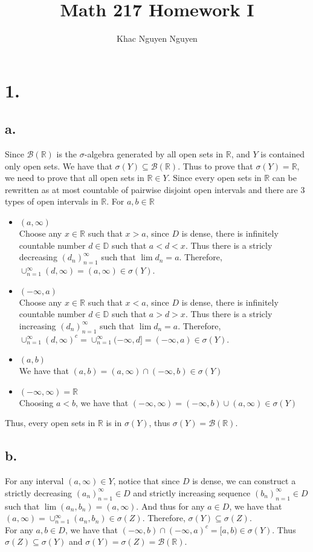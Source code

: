 \documentclass[11pt]{article}
\title{\textbf{Math 217 Homework I}}
\author{Khac Nguyen Nguyen}
\date{}
\theoremstyle{mystyle}
\theoremstyle{definition}
\begin{document}
\section*{1.}
\subsection*{a.}
Since $\mathcal{B}(\mathbb{R})$ is the $\sigma$-algebra generated by all open sets in $\mathbb{R}$, and $Y$ is contained only open sets. We have that $\sigma(Y) \subseteq \mathcal{B}(\mathbb{R})$. Thus to prove that $\sigma(Y) = \mathbb{R}$, we need to prove that all open sets in $\mathbb{R} \in Y$. Since every open sets in $\mathbb{R}$ can be rewritten as at most countable of pairwise disjoint open intervals and there are 3 types of open intervals in $\mathbb{R}$. For $a, b \in \mathbb{R}$ 
\begin{itemize}
  \item $(a,\infty)$ \\
    Choose any $x \in \mathbb{R}$ such that $x>a$, since $D$ is dense, there is infinitely countable number $d \in \mathbb{D}$ such that $a<d<x$. Thus there is a stricly decreasing $(d_n)_{n=1}^\infty$ such that $\lim d_n = a$. Therefore, $\cup_{n=1}^\infty (d, \infty) = (a, \infty) \in \sigma(Y)$.    
  \item $(-\infty, a)$ \\
    Choose any $x \in \mathbb{R}$ such that $x<a$, since $D$ is dense, there is infinitely countable number $d \in \mathbb{D}$ such that $a>d>x$. Thus there is a stricly increasing $(d_n)_{n=1}^\infty$ such that $\lim d_n = a$. Therefore, $\cup_{n=1}^\infty (d, \infty)^c = \cup_{n=1}^\infty (-\infty, d] = (-\infty, a) \in \sigma(Y)$.    
  \item $(a, b)$ \\
    We have that $(a,b) = (a, \infty) \cap (-\infty, b) \in \sigma(Y)$
  \item $(-\infty, \infty) = \mathbb{R}$ \\
    Choosing $a<b$, we have that 
    $(-\infty, \infty) = (-\infty, b) \cup (a, \infty) \in \sigma(Y)$
\end{itemize}
Thus, every open sets in $\mathbb{R}$ is in $\sigma(Y)$, thus $\sigma(Y) = \mathcal{B}(\mathbb{R})$. 
\subsection*{b.}
For any interval $(a, \infty) \in Y$,  notice that since $D$ is dense, we can construct a strictly decreasing $(a_n)_{n=1}^\infty \in D$ and strictly increasing sequence $(b_n)_{n=1}^\infty \in D$ such that $\lim (a_n, b_n) = (a, \infty)$. And thus for any $a \in D$, we have that $(a, \infty) = \cup_{n=1}^\infty (a_n, b_n) \in \sigma(Z)$. Therefore, $\sigma(Y) \subseteq \sigma(Z)$. \\
For any $a, b \in D$, we have that $(-\infty, b) \cap (-\infty, a)^c = [a, b) \in \sigma(Y)$. Thus $\sigma(Z) \subseteq \sigma(Y)$ and $\sigma(Y) = \sigma(Z) = \mathcal{B}(\mathbb{R})$.  
\end{document}
